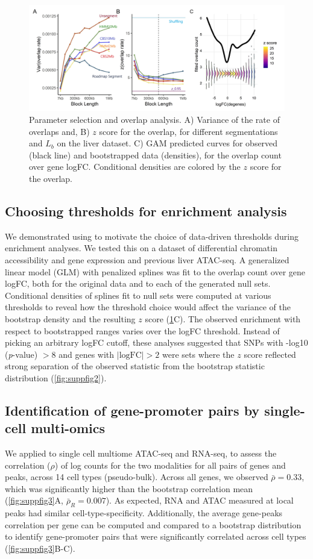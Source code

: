 \begin{figure}[H]
\centering%
\setlength{\abovecaptionskip}{-0.1cm}
\setlength{\belowcaptionskip}{-0.1cm}
\includegraphics[width=.5\textwidth]{Figures/fig2_3.jpeg}
\caption{
  Parameter selection and overlap analysis.
  A) Variance of the rate of overlaps and,
  B) $z$ score for the overlap,
  for different segmentations and $L_b$ on the liver 
  dataset.
  C) GAM predicted curves for observed (black line) and
  bootstrapped data (densities),
  for the overlap count over gene logFC.
  Conditional densities are colored by the $z$ score for the overlap.
}
\label{fig:result}
\end{figure}

\subsection{Choosing thresholds for enrichment analysis}
We demonstrated using \bootranges to motivate the choice of data-driven thresholds 
during enrichment analyses. We tested this on a dataset of differential chromatin accessibility and gene expression 
\citep{alasoo2018shared,lee2020fluent} and previous liver ATAC-seq.
A generalized linear model (GLM) with penalized splines was
fit to the overlap count over gene logFC, both for the original
data and to each of the generated null sets.
Conditional densities of splines fit to null sets
were computed at various thresholds to reveal how
the threshold choice would affect the
variance of the bootstrap density and the resulting $z$ score
(\cref{fig:result}C). 
The observed enrichment with respect to bootstrapped ranges 
varies over the logFC threshold. Instead of picking an arbitrary logFC cutoff, 
these analyses suggested that SNPs with -log10 (\textit{p}-value) $> 8$ and 
genes with $|\textrm{logFC}| > 2$ were sets where the $z$ score reflected 
strong separation of the observed statistic from the bootstrap statistic 
distribution
(\cref{fig:suppfig2}).

\subsection{Identification of gene-promoter pairs by single-cell multi-omics}
We applied \bootranges to
single cell multiome
ATAC-seq and RNA-seq, to assess the correlation ($\rho$) of log counts for the two
modalities for all pairs of genes and peaks, across
14 cell types (pseudo-bulk). Across all genes, we observed
$\bar{\rho} = 0.33$, which was 
significantly higher than the bootstrap correlation mean
(\cref{fig:suppfig3}A, $\bar{\rho}_{R} = 0.007$). As expected, RNA
and ATAC measured at local peaks had similar cell-type-specificity.
Additionally, the average gene-peaks correlation per gene can be
computed and compared to a bootstrap distribution to
identify gene-promoter pairs that were significantly correlated across
cell types (\cref{fig:suppfig3}B-C).

